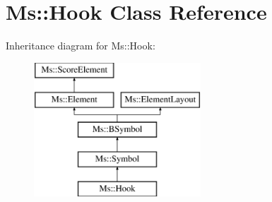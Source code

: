 \hypertarget{class_ms_1_1_hook}{}\section{Ms\+:\+:Hook Class Reference}
\label{class_ms_1_1_hook}
Inheritance diagram for Ms\+:\+:Hook\+:\begin{figure}[H]
\begin{center}
\leavevmode
\includegraphics[height=5.000000cm]{class_ms_1_1_hook}
\end{center}
\end{figure}
